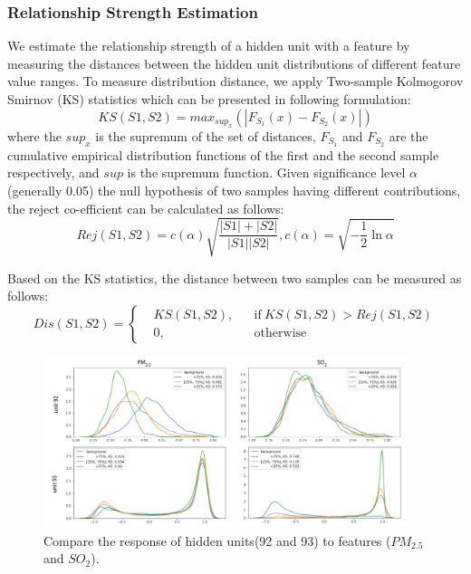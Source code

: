 \subsubsection{Relationship Strength Estimation}
\label{section:qualify_response}
We estimate the relationship strength of a hidden unit with a feature by measuring the distances between the hidden unit distributions of different feature value ranges.
To measure distribution distance, we apply Two-sample Kolmogorov Smirnov (KS) statistics which can be presented in following formulation:
\begin{equation} 
KS(S1, S2) = max_{sup_x}(|F_{S_1}(x) - F_{S_2}(x)|)
\end{equation}
where the $sup_x$ is the supremum of the set of distances, $F_{S_1}$ and $F_{S_2}$ are the cumulative empirical distribution functions of the first and the second sample respectively, and $sup$ is the supremum function.
Given significance level $\alpha$ (generally 0.05) the null hypothesis of two samples having different contributions, the reject co-efficient can be calculated as follows:
\begin{equation} 
Rej(S1, S2) = c(\alpha)\sqrt{\frac{|S1| + |S2|}{|S1||S2|}},  c(\alpha) = \sqrt{-\frac{1}{2}\ln\alpha }
\end{equation}

Based on the KS statistics, the distance between two samples can be measured as follows:
\begin{equation} 
Dis(S1, S2) = \left \{
  \begin{aligned}
    &KS(S1, S2), && \text{if}\ KS(S1, S2) > Rej(S1, S2)\\
    &0, && \text{otherwise}
  \end{aligned} \right.
\end{equation}

\begin{figure}[t]
	\centering
	\includegraphics[width=0.95\textwidth]{figure/MultiRNNExplorer/methods/unit_response_kdeplot.pdf}
	\vspace{-3mm}
	\caption{Compare the response of hidden units(92 and 93) to features ($PM_{2.5}$ and $SO_2$). 
	}
	\label{fig:unit_distribution_subgroup}
	\vspace{-4mm}
\end{figure}



